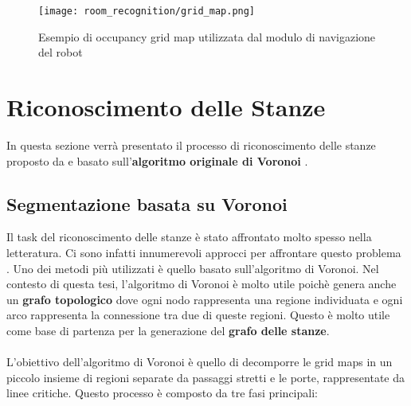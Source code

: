 \begin{figure}[H]
  \centering
  \texttt{[image: room\_recognition/grid\_map.png]}
  \caption{Esempio di occupancy grid map utilizzata dal modulo di navigazione del robot}
\end{figure}

\section{Riconoscimento delle Stanze}
In questa sezione verrà presentato il processo di riconoscimento delle stanze proposto da \cite{mora} e basato sull'\textbf{algoritmo originale di Voronoi} \cite{thrun}.

\subsection{Segmentazione basata su Voronoi}
Il task del riconoscimento delle stanze è stato affrontato molto spesso nella letteratura. Ci sono infatti innumerevoli approcci per affrontare questo problema \cite{bormann}. Uno dei metodi più utilizzati è quello basato sull'algoritmo di Voronoi. Nel contesto di questa tesi, l'algoritmo di Voronoi \cite{thrun} è molto utile poichè genera anche un \textbf{grafo topologico} dove ogni nodo rappresenta una regione individuata e ogni arco rappresenta la connessione tra due di queste regioni. Questo è molto utile come base di partenza per la generazione del \textbf{grafo delle stanze}.\\\\
L'obiettivo dell'algoritmo di Voronoi è quello di decomporre le grid maps in un piccolo insieme di regioni separate da passaggi stretti e le porte, rappresentate da linee critiche. Questo processo è composto da tre fasi principali:

